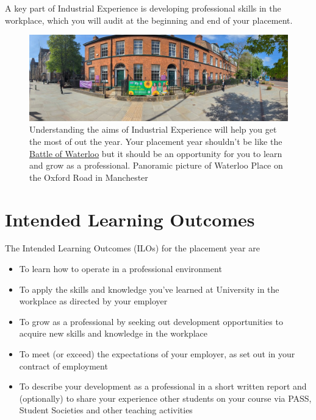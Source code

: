 \documentclass[
]{book}
\providecommand{\tightlist}{%
  \setlength{\itemsep}{0pt}\setlength{\parskip}{0pt}}
\begin{document}
A key part of Industrial Experience is developing professional skills in the workplace, which you will audit at the beginning and end of your placement.

\begin{figure}

{\centering \includegraphics[width=1\linewidth]{images/waterloo} 

}

\caption{Understanding the aims of Industrial Experience will help you get the most of out the year. Your placement year shouldn't be like the \href{https://en.wikipedia.org/wiki/Battle_of_Waterloo}{Battle of Waterloo} but it should be an opportunity for you to learn and grow as a professional. Panoramic picture of Waterloo Place on the Oxford Road in Manchester}\label{fig:aims-fig}
\end{figure}



\section{Intended Learning Outcomes}\label{ilos}

The Intended Learning Outcomes (ILOs) for the placement year are

\begin{itemize}
\tightlist
\item
  To learn how to operate in a professional environment
\item
  To apply the skills and knowledge you've learned at University in the workplace as directed by your employer
\item
  To grow as a professional by seeking out development opportunities to acquire new skills and knowledge in the workplace
\item
  To meet (or exceed) the expectations of your employer, as set out in your contract of employment
\item
  To describe your development as a professional in a short written report and (optionally) to share your experience other students on your course via PASS, Student Societies and other teaching activities
\end{itemize}
\end{document}
